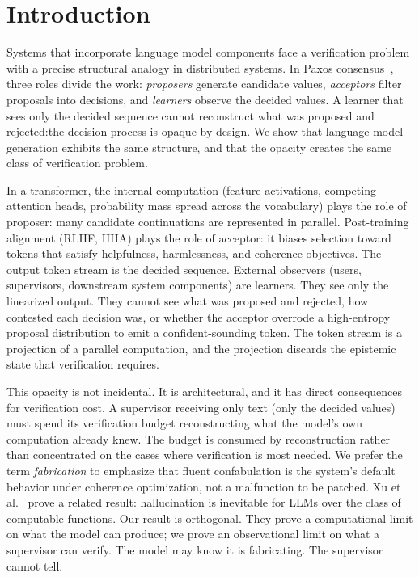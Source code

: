 \section{Introduction}\label{sec:intro}

Systems that incorporate language model components face a verification problem
with a precise structural analogy in distributed systems. In Paxos
consensus~\cite{paxos}, three roles divide the work: \emph{proposers} generate
candidate values, \emph{acceptors} filter proposals into decisions, and
\emph{learners} observe the decided values. A learner that sees only the decided
sequence cannot reconstruct what was proposed and rejected:the decision
process is opaque by design. We show that language model generation exhibits the
same structure, and that the opacity creates the same class of verification
problem.

In a transformer, the internal computation (feature activations, competing
attention heads, probability mass spread across the vocabulary) plays the role
of proposer: many candidate continuations are represented in parallel. Post-training
alignment (RLHF, HHA) plays the role of acceptor: it biases selection toward
tokens that satisfy helpfulness, harmlessness, and coherence objectives.
The output token stream is the decided sequence. External
observers (users, supervisors, downstream system components) are learners.
They see only the linearized output. They cannot see what was proposed and
rejected, how contested each decision was, or whether the acceptor overrode a
high-entropy proposal distribution to emit a confident-sounding token.
The token stream is a projection of a parallel computation, and the
projection discards the epistemic state that verification requires.

This opacity is not incidental. It is architectural, and it has direct
consequences for verification cost. A supervisor receiving only text (only the
decided values) must spend its verification budget reconstructing what the
model's own computation already knew. The budget is consumed by
reconstruction rather than concentrated on the cases where verification is most
needed. We prefer the term \emph{fabrication} to emphasize that fluent
confabulation is the system's default behavior under coherence optimization, not
a malfunction to be patched. Xu et al.~\cite{xu2024hallucination} prove a
related result: hallucination is inevitable for LLMs over the class of
computable functions. Our result is orthogonal. They prove a computational limit
on what the model can produce; we prove an observational limit on what a
supervisor can verify. The model may know it is fabricating. The supervisor
cannot tell.

